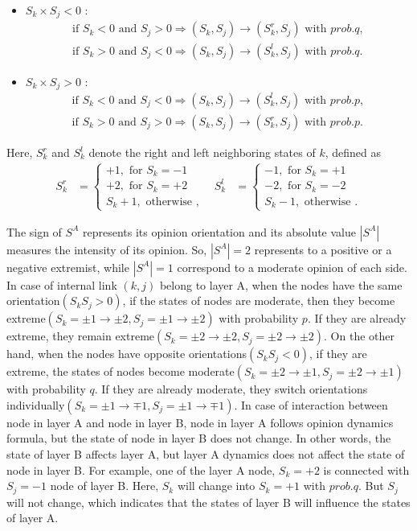 \documentclass[english]{cccconf}
\begin{document}
\begin{itemize}
\item $S_k \times S_j < 0$ :
\begin{align*}
\mbox{if } S_k<0 \mbox{ and } S_j>0  \Rightarrow (S_k, S_j) \rightarrow (S_k^r, S_j) \mbox{ with } prob.q,\\
\mbox{if } S_k>0 \mbox{ and } S_j<0  \Rightarrow (S_k, S_j) \rightarrow (S_k^l, S_j) \mbox{ with } prob.q.
\end{align*}
\item $S_k \times S_j > 0$ :
\begin{align*}
\mbox{if } S_k<0 \mbox{ and } S_j<0  \Rightarrow (S_k, S_j) \rightarrow (S_k^l, S_j) \mbox{ with } prob.p,\\
\mbox{if } S_k>0 \mbox{ and } S_j>0  \Rightarrow (S_k, S_j) \rightarrow (S_k^r, S_j) \mbox{ with } prob.p.
\end{align*}
\end{itemize}
Here, $S_k^r$ and $S_k^l$ denote the right and left neighboring states of $k$, defined as
\begin{align*}
S_k^r &= \left\{\begin{matrix}
+1,\mbox{ for } S_k = -1\\
+2,\mbox{ for } S_k = +2\\ 
S_k + 1,\mbox{ otherwise }, 
\end{matrix}\right. &
S_k^l &= \left\{\begin{matrix}
-1,\mbox{ for } S_k= +1
\\ -2,\mbox{ for } S_k=-2
\\ S_k - 1,\mbox{ otherwise }.
\end{matrix}\right.
\end{align*}


The sign of $S^A$ represents its opinion orientation and its absolute value $|S^A|$ measures the intensity of its opinion. So, $|S^A|=2$ represents to a positive or a negative extremist, while  $|S^A|=1$ correspond to a moderate opinion of each side. In case of internal link $(k, j)$ belong to layer A, when the nodes have the same orientation$(S_kS_j>0)$, if the states of nodes are moderate, then they become extreme$(S_k=\pm1 \rightarrow \pm2, S_j= \pm1 \rightarrow \pm2)$ with probability $p$. If they are already extreme, they remain extreme$(S_k=\pm2 \rightarrow \pm2, S_j= \pm2 \rightarrow \pm2)$. On the other hand, when the nodes have opposite orientations$(S_kS_j<0)$, if they are extreme, the states of nodes become moderate$(S_k=\pm2 \rightarrow \pm1, S_j= \pm2 \rightarrow \pm1)$ with probability $q$. If they are already moderate, they switch orientations individually$(S_k=\pm1 \rightarrow \mp1, S_j= \pm1 \rightarrow \mp1)$.  In case of interaction between node in layer A and node in layer B, node in layer A follows opinion dynamics formula, but the state of node in layer B does not change. In other words, the state of layer B affects layer A, but layer A dynamics does not affect the state of node in layer B. For example, one of the layer A node, $S_k = +2$ is connected with  $S_j = -1$ node of layer B. Here, $S_k$ will change into $S_k = +1$ with $prob.q$. But $S_j$ will not change, which indicates that the states of layer B will influence the states of layer A.
\end{document}
